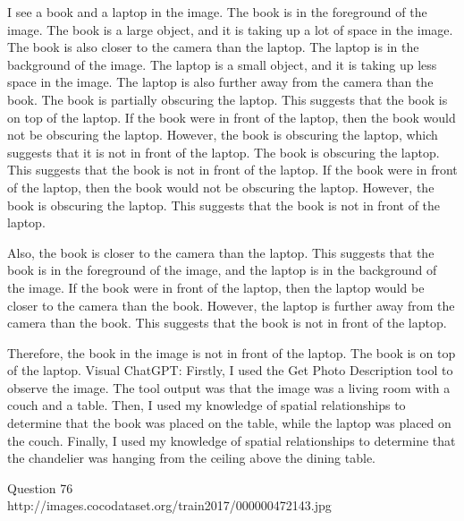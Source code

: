 \begin{enumerate}
    I see a book and a laptop in the image.
    The book is in the foreground of the image. The book is a large object, and it is taking up a lot of space in the image. The book is also closer to the camera than the laptop.
    The laptop is in the background of the image. The laptop is a small object, and it is taking up less space in the image. The laptop is also further away from the camera than the book.
    The book is partially obscuring the laptop. This suggests that the book is on top of the laptop.
    If the book were in front of the laptop, then the book would not be obscuring the laptop. However, the book is obscuring the laptop, which suggests that it is not in front of the laptop.
    The book is obscuring the laptop. This suggests that the book is not in front of the laptop. If the book were in front of the laptop, then the book would not be obscuring the laptop. However, the book is obscuring the laptop. This suggests that the book is not in front of the laptop.
    
    Also, the book is closer to the camera than the laptop. This suggests that the book is in the foreground of the image, and the laptop is in the background of the image. If the book were in front of the laptop, then the laptop would be closer to the camera than the book. However, the laptop is further away from the camera than the book. This suggests that the book is not in front of the laptop.
    
    Therefore, the book in the image is not in front of the laptop. The book is on top of the laptop.
    \subitem Visual ChatGPT: Firstly, I used the Get Photo Description tool to observe the image. The tool output was that the image was a living room with a couch and a table. Then, I used my knowledge of spatial relationships to determine that the book was placed on the table, while the laptop was placed on the couch. Finally, I used my knowledge of spatial relationships to determine that the chandelier was hanging from the ceiling above the dining table.
\end{enumerate}
Question 76\\
http://images.cocodataset.org/train2017/000000472143.jpg
